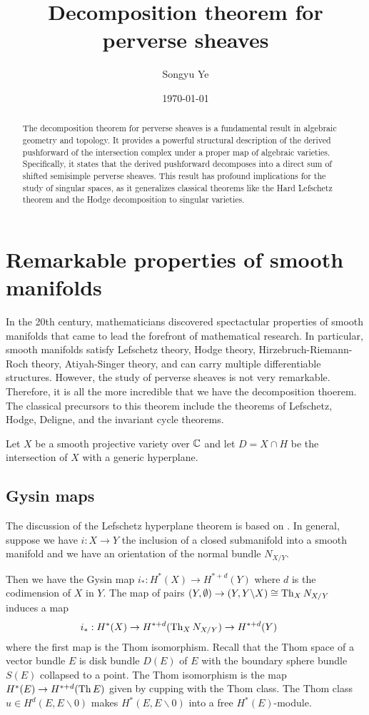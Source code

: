 \documentclass[12pt]{article}
\title{Decomposition theorem for perverse sheaves}
\author{Songyu Ye}
\date{\today}
\begin{document}
\notestitle

\begin{abstract}
    The decomposition theorem for perverse sheaves is a fundamental result in algebraic geometry and topology. It provides a powerful structural description of the derived pushforward of the intersection complex under a proper map of algebraic varieties. Specifically, it states that the derived pushforward decomposes into a direct sum of shifted semisimple perverse sheaves. This result has profound implications for the study of singular spaces, as it generalizes classical theorems like the Hard Lefschetz theorem and the Hodge decomposition to singular varieties.
\end{abstract}

\tableofcontents

\section{Remarkable properties of smooth manifolds}
In the 20th century, mathematicians discovered spectactular properties of smooth manifolds that came to lead the forefront of mathematical research. In particular, smooth manifolds satisfy Lefschetz theory, Hodge theory, Hirzebruch-Riemann-Roch theory, Atiyah-Singer theory, and can carry multiple differentiable structures. However, the study of perverse sheaves is not very remarkable. Therefore, it is all the more incredible that we have the decomposition thoerem. The classical precursors to this theorem include the theorems of Lefschetz, Hodge, Deligne, and the invariant cycle theorems. 

Let $X$ be a smooth projective variety over $\mathbb{C}$ and let $D = X \cap H$ be the intersection of $X$ with a generic hyperplane.

\subsection{Gysin maps}
The discussion of the Lefschetz hyperplane theorem is based on \cite{griffiths-harris}. In general, suppose we have $i:X\to Y$ the inclusion of a
closed submanifold into a smooth manifold and we have an orientation of the normal
bundle $N_{X/Y}$.

Then we have the Gysin map $i_*:H^*(X)\to H^{*+d}(Y)$ where $d$ is the codimension of $X$ in $Y$. The map of pairs $(Y,\emptyset)\to (Y,Y\backslash X) \cong
    \operatorname{Th}_X N_{X/Y}$ induces a map \begin{align*}
    i_*:H^*(X) & \to H^{*+d}(\operatorname{Th}_X N_{X/Y}) \to H^{*+d}(Y)\
\end{align*} where the first map is the Thom isomorphism.
Recall that the Thom space of a vector bundle $E$ is disk bundle $D(E)$ of $E$ with the boundary
sphere bundle $S(E)$ collapsed to a point. The Thom isomorphism is the map $H^*(E)\to H^{*+d}(\operatorname{Th} E)$
given by cupping with the Thom class. The Thom class $u \in H^d(E,E\backslash 0)$ makes
$H^*(E,E\backslash 0)$ into a free $H^*(E)$-module.
\end{document}
